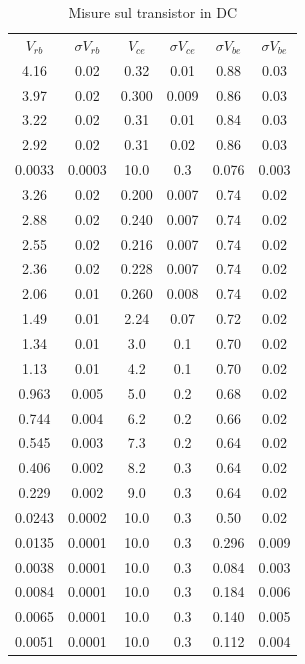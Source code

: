 \documentclass[10pt,a4paper]{article}
\begin{document}
\begin{table}[!htb]\centering
\begin{tabular}{|c|c|c|c|c|c|}
\hline
$V_{rb}$ & $\sigma V_{rb}$ & $V_{ce}$ & $\sigma V_{ce}$ & $\sigma V_{be}$ & $\sigma V_{be}$\\
4.16 & 0.02 & 0.32 & 0.01 & 0.88 & 0.03\\
3.97 & 0.02 & 0.300 & 0.009 & 0.86 & 0.03\\
3.22 & 0.02 & 0.31 & 0.01 & 0.84 & 0.03\\
2.92 & 0.02 & 0.31 & 0.02 & 0.86 & 0.03\\
0.0033 & 0.0003 & 10.0 & 0.3 & 0.076 & 0.003\\
3.26 & 0.02 & 0.200 & 0.007 & 0.74 & 0.02\\
2.88 & 0.02 & 0.240 & 0.007 & 0.74 & 0.02\\
2.55 & 0.02 & 0.216 & 0.007 & 0.74 & 0.02\\
2.36 & 0.02 & 0.228 & 0.007 & 0.74 & 0.02\\
2.06 & 0.01 & 0.260 & 0.008 & 0.74 & 0.02\\
1.49 & 0.01 & 2.24 & 0.07 & 0.72 & 0.02\\
1.34 & 0.01 & 3.0 & 0.1 & 0.70 & 0.02\\
1.13 & 0.01 & 4.2 & 0.1 & 0.70 & 0.02\\
0.963 & 0.005 & 5.0 & 0.2 & 0.68 & 0.02\\
0.744 & 0.004 & 6.2 & 0.2 & 0.66 & 0.02\\
0.545 & 0.003 & 7.3 & 0.2 & 0.64 & 0.02\\
0.406 & 0.002 & 8.2 & 0.3 & 0.64 & 0.02\\
0.229 & 0.002 & 9.0 & 0.3 & 0.64 & 0.02\\
0.0243 & 0.0002 & 10.0 & 0.3 & 0.50 & 0.02\\
0.0135 & 0.0001 & 10.0 & 0.3 & 0.296 & 0.009\\
0.0038 & 0.0001 & 10.0 & 0.3 & 0.084 & 0.003\\
0.0084 & 0.0001 & 10.0 & 0.3 & 0.184 & 0.006\\
0.0065 & 0.0001 & 10.0 & 0.3 & 0.140 & 0.005\\
0.0051 & 0.0001 & 10.0 & 0.3 & 0.112 & 0.004\\
\hline
\end{tabular}
\caption{Misure sul transistor in DC} \label{misureDC}
\end{table}
\end{document}
